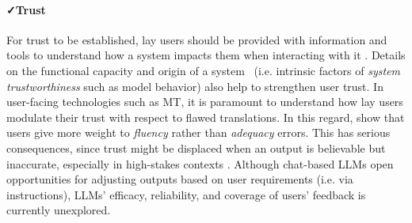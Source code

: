 \paragraph{\faCheck \space Trust} %
For trust to be established, lay users 
should be provided with 
information and tools to understand how a system impacts them when interacting with it 
\citep{litschko-etal-2023-establishing}. 
Details on the functional capacity  and origin of a system~\citep{davis-1979-applications} (i.e. intrinsic factors of \emph{system trustworthiness} such as 
model behavior) also help to strengthen user trust.
In user-facing technologies such as MT, it is paramount to understand how lay users %
modulate their trust with respect to flawed translations.
In this regard, 
\citet{martindale-carpuat-2018-fluency} 
show that users give more weight to \emph{fluency} rather than \emph{adequacy} errors. This has serious consequences, since trust might be displaced when an output is believable but inaccurate, especially in high-stakes contexts 
\citep{mehandru-etal-2023-physician}. Although chat-based LLMs open opportunities for adjusting outputs based on user requirements 
(i.e. via instructions), 
LLMs' efficacy, reliability, and coverage of users' feedback is currently unexplored.

